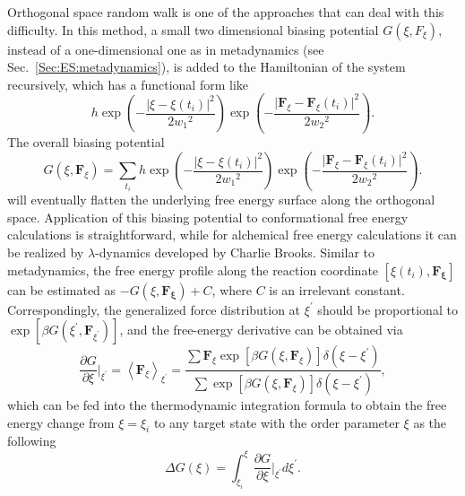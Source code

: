 Orthogonal space random walk is one of the approaches that can deal with this difficulty. In this method, a small two dimensional biasing potential $G(\xi,F_{\xi})$, instead of a one-dimensional one as in metadynamics (see Sec.~\ref{Sec:ES:metadynamics}), is added to the Hamiltonian of the system recursively, which has a functional form like
\begin{equation}
   h\exp{\left(-\frac{\lvert\xi-\xi(t_i)\rvert^2}{2{w_1}^2}\right)}\exp{\left(-\frac{\lvert \mathbf{F}_{\xi}-\mathbf{F}_{\xi}(t_i)\rvert^2}{2{w_2}^2}\right)}.
\end{equation}
The overall biasing potential
\begin{equation}
G(\xi,\mathbf{F}_\xi)=\sum\limits_{t_i}h\exp{\left(-\frac{\lvert\xi-\xi(t_i)\rvert^2}{2{w_1}^2}\right)}\exp{\left(-\frac{\lvert \mathbf{F}_{\xi}-\mathbf{F}_{\xi}(t_i)\rvert^2}{2{w_2}^2}\right)}.
\end{equation}
will eventually flatten the underlying free energy surface along the orthogonal space.
Application of this biasing potential to conformational free energy calculations is straightforward, while for alchemical free energy calculations it can be realized by $\lambda$-dynamics developed by Charlie Brooks.\cite{KongJCP1996} Similar to metadynamics, the free energy profile along the reaction coordinate $\left[\xi(t_i), \mathbf{F_\xi}\right]$ can be estimated as $-G\left(\xi,\mathbf{F_{\xi}}\right)+C$, where $C$ is an irrelevant constant. Correspondingly, the generalized force distribution at $\xi^\prime$ should be proportional to $\exp{\left[\beta G\left(\xi^\prime,\mathbf{F}_{\xi^\prime}\right)\right]}$, and the free-energy derivative can be obtained via
\begin{equation}
	\frac{\partial G}{\partial \xi}\bigg\rvert_{\xi^\prime}=\left<\mathbf{F}_\xi\right>_{\xi^\prime}=\frac{\sum\mathbf{F}_\xi\exp{\left[\beta G(\xi,\mathbf{F}_\xi)\right]}\delta(\xi-\xi^\prime)}{\sum\exp{\left[\beta G(\xi,\mathbf{F}_\xi)\right]}\delta(\xi-\xi^\prime)},
\end{equation}
which can be fed into the thermodynamic integration formula to obtain the free energy change from $\xi=\xi_i$ to any target state with the order parameter $\xi$ as the following
\begin{equation}
	\Delta G(\xi) = \int_{\xi_i}^{\xi}\frac{\partial G}{\partial \xi}\bigg\rvert_{\xi^\prime}d\xi^\prime.
\end{equation}